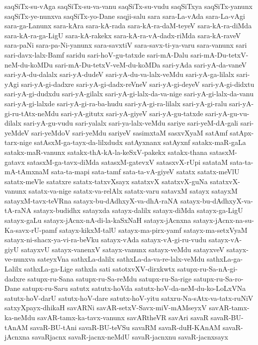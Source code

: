 {saqSiTx-su-vAga
saqSiTx-su-va-vanu
saqSiTx-su-vudu
saqSiTxya
saqSiTx-yanunx
saqSiTx-ye-nunxva
saqSiTx-yo-Dane
saqji-salu
sara
sara-La-vAda
sara-La-vAgi
sara-ga-Lanunx
sara-kAra
sara-kA-rada
sara-kA-ra-daM-teyeV
sara-kA-ra-diMda
sara-kA-ra-ga-LigU
sara-kA-rakekx
sara-kA-ra-vA-dadx-riMda
sara-kA-raveV
sara-paNi
sara-pa-Ni-yanunx
sara-savxtiV
sara-savx-ti-ya-varu
sara-vanunx
sari
sari-davx-lalx-Bamf
saridu
sari-hoV-gu-tatxde
sari-mA-Dalu
sari-mA-Du-tetxV-neM-du-koMDu
sari-mA-Du-tetxV-veM-du-koMDa
sari-yAda
sari-yA-da-vaneV
sari-yA-du-dalalx
sari-yA-dudeV
sari-yA-du-va-lalx-veMdu
sari-yA-ga-lilalx
sari-yAgi
sari-yA-gi-dadxre
sari-yA-gi-dadx-reVneV
sari-yA-gi-deyeV
sari-yA-gi-didxtu
sari-yA-gi-dudxdu
sari-yA-gilalx
sari-yA-gi-lalx-da-va-nige
sari-yA-gi-lalx-da-vanu
sari-yA-gi-lalxde
sari-yA-gi-ra-ba-hudu
sari-yA-gi-ra-lilalx
sari-yA-gi-ralu
sari-yA-gi-ru-tAtx-neMdu
sari-yA-gitutx
sari-yA-giyeV
sari-yA-gu-tatxde
sari-yA-gu-vu-dilalx
sari-yA-gu-vudu
sari-yalalx
sari-ya-lalx-veMdu
sariye
sari-yeM-dA-gali
sari-yeMdeV
sari-yeMdoV
sari-yeMdu
sariyeV
sasimxtaM
sasxvXyaM
satAmf
satApx-tarx-nige
satAsxM-ga-tayx-da-lilxdudx
satAyxnanx
satAyxnf
satakx-maR-gaLa
satakx-maR-vanunx
satakx-thA-kA-la-keSxV-pakekx
satakx-thana
satasxM-gatavx
satasxM-ga-tavx-diMda
satasxM-gatevxV
satasxvX-rUpi
satataM
sata-ta-mA-tAmxnaM
sata-ta-mapi
sata-tamf
sata-ta-vA-giyeV
satatx
satatx-meVlU
satatx-meVle
satatxre
satatx-tatxvXsayx
satatxvX
satatxvX-guNa
satatxvX-vanunx
satatx-va-nige
satatx-va-relAlx
satatx-varu
satavxM
satayx
satayxM
satayxM-tavx-teVRna
satayx-bu-dAdhxyX-va-dhA-raNA
satayx-bu-dAdhxyX-va-tA-raNA
satayx-budidhx
satayxda
satayx-dalilx
satayx-diMda
satayx-ga-LigU
satayx-gaLu
satayx-jAcnx-nA-di-la-kaSxNaH
satayx-jAcnxna
satayx-jAcnx-na-su-Ka-savx-rU-pamf
satayx-kikxM-talU
satayx-ma-pirx-yamf
satayx-ma-setxVyaM
satayx-ni-shacx-ya-vi-ra-beVku
satayx-vAda
satayx-vA-gi-ru-vudu
satayx-vA-giyU
satayxvU
satayx-vanenxV
satayx-vanunx
satayx-veMdu
satayxveV
satayx-ve-nunxva
sateyxVna
sathxLa-dalilx
sathxLa-da-va-re-lalx-veMdu
sathxLa-ga-Lalilx
sathxLa-ga-Lige
sathxla
sati
satotxvXV-dirxkwtx
satupx-ru-Sa-nA-gi-dadxre
satupx-ru-Sana
satupx-ru-Sa-reMdu
satupx-ru-Sa-rige
satupx-ru-Sa-ro-Dane
satupx-ru-Saru
satutx
satutx-hoVda
satutx-hoV-da-neM-du-ko-LoLxVNa
satutx-hoV-darU
satutx-hoV-dare
satutx-hoV-yitu
satxru-Na-sAtx-va-tatx-ruNiV
satxyXpayx-dhikaH
savARNi
savAR-setxV-Savx-miV-mAMseyxV
savAR-tamx-ka-neMdu
savAR-tamx-ka-tavx-vanunx
savARtheVR
savAri
savaR
savaR-BU-tAnAM
savaR-BU-tAni
savaR-BU-teVSu
savaRM
savaR-duH-KAnAM
savaR-jAcnxna
savaRjacnx
savaR-jacnx-neMdU
savaR-jacnxnu
savaR-jacnxsayx
}
